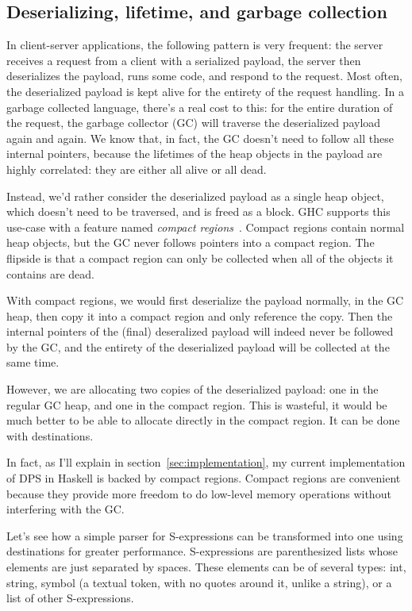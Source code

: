 \documentclass[english]{jflart}
\begin{document}
\subsection{Deserializing, lifetime, and garbage collection}\label{ssec:parser-sexpr}

In client-server applications, the following pattern is very frequent: the server receives a request from a client with a serialized payload, the server then deserializes the payload, runs some code, and respond to the request. Most often, the deserialized payload is kept alive for the entirety of the request handling. In a garbage collected language, there's a real cost to this: for the entire duration of the request, the garbage collector (GC) will traverse the deserialized payload again and again. We know that, in fact, the GC doesn't need to follow all these internal pointers, because the lifetimes of the heap objects in the payload are highly correlated: they are either all alive or all dead.

Instead, we'd rather consider the deserialized payload as a single heap object, which doesn't need to be traversed, and is freed as a block. GHC supports this use-case with a feature named \emph{compact regions}~\cite{yang_efficient_2015}. Compact regions contain normal heap objects, but the GC never follows pointers into a compact region. The flipside is that a compact region can only be collected when all of the objects it contains are dead.

With compact regions, we would first deserialize the payload normally, in the GC heap, then copy it into a compact region and only reference the copy. Then the internal pointers of the (final) deseralized payload will indeed never be followed by the GC, and the entirety of the deserialized payload will be collected at the same time.

However, we are allocating two copies of the deserialized payload: one in the regular GC heap, and one in the compact region. This is wasteful, it would be much better to be able to allocate directly in the compact region. It can be done with destinations.

In fact, as I'll explain in section~\ref{sec:implementation}, my current implementation of DPS in Haskell is backed by compact regions. Compact regions are convenient because they provide more freedom to do low-level memory operations without interfering with the GC.

Let's see how a simple parser for S-expressions can be transformed into one using destinations for greater performance. S-expressions are parenthesized lists whose elements are just separated by spaces. These elements can be of several types: int, string, symbol (a textual token, with no quotes around it, unlike a string), or a list of other S-expressions.
\end{document}
